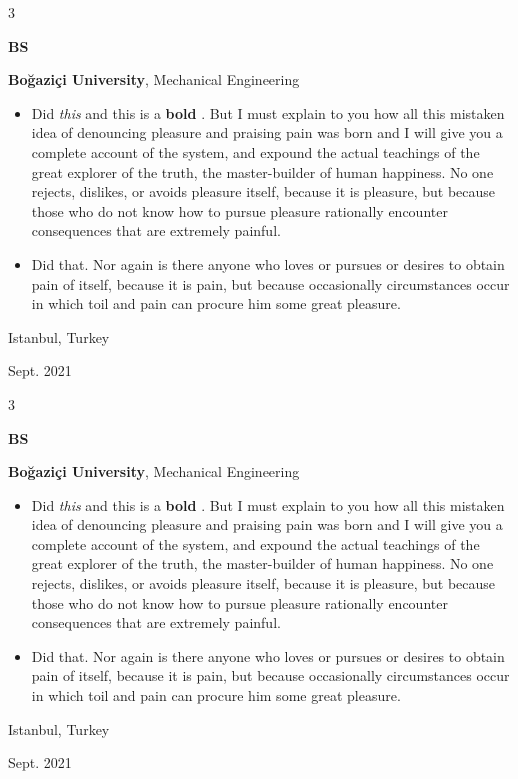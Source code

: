 \documentclass[10pt, letterpaper]{article}
\newenvironment{highlights}{
    \begin{itemize}[
        topsep=0.10 cm,
        parsep=0.10 cm,
        partopsep=0pt,
        itemsep=0pt,
        leftmargin=0.4 cm + 10pt
    ]
}{
    \end{itemize}
} %
\newenvironment{threecolentry}[3][]{
    \onecolentry
    \def\thirdColumn{#3}
    \setcolumnwidth{1 cm, \fill, 4.5 cm}
    \begin{paracol}{3}
    {\raggedright #2} \switchcolumn
}{
    \switchcolumn \raggedleft \thirdColumn
    \end{paracol}
    \endonecolentry
} %
\let\hrefWithoutArrow\href
\renewcommand{\href}[2]{\hrefWithoutArrow{#1}{\mbox{\ifthenelse{\equal{#2}{}}{ }{#2 }\raisebox{.15ex}{\footnotesize \faExternalLink*}}}}
\begin{document}
        \begin{threecolentry}{\textbf{BS}}{
            Istanbul, Turkey

        Sept. 2021
        }
            \textbf{Boğaziçi University}, Mechanical Engineering
            \begin{highlights}
                \item Did \textit{this} and this is a \textbf{bold} \href{https://example.com}{link}. But I must explain to you how all this mistaken idea of denouncing pleasure and praising pain was born and I will give you a complete account of the system, and expound the actual teachings of the great explorer of the truth, the master-builder of human happiness. No one rejects, dislikes, or avoids pleasure itself, because it is pleasure, but because those who do not know how to pursue pleasure rationally encounter consequences that are extremely painful.
                \item Did that. Nor again is there anyone who loves or pursues or desires to obtain pain of itself, because it is pain, but because occasionally circumstances occur in which toil and pain can procure him some great pleasure.
            \end{highlights}
        \end{threecolentry}

        \vspace{0.2 cm}

        \begin{threecolentry}{\textbf{BS}}{
            Istanbul, Turkey

        Sept. 2021
        }
            \textbf{Boğaziçi University}, Mechanical Engineering
            \begin{highlights}
                \item Did \textit{this} and this is a \textbf{bold} \href{https://example.com}{link}. But I must explain to you how all this mistaken idea of denouncing pleasure and praising pain was born and I will give you a complete account of the system, and expound the actual teachings of the great explorer of the truth, the master-builder of human happiness. No one rejects, dislikes, or avoids pleasure itself, because it is pleasure, but because those who do not know how to pursue pleasure rationally encounter consequences that are extremely painful.
                \item Did that. Nor again is there anyone who loves or pursues or desires to obtain pain of itself, because it is pain, but because occasionally circumstances occur in which toil and pain can procure him some great pleasure.
            \end{highlights}
        \end{threecolentry}
\end{document}
